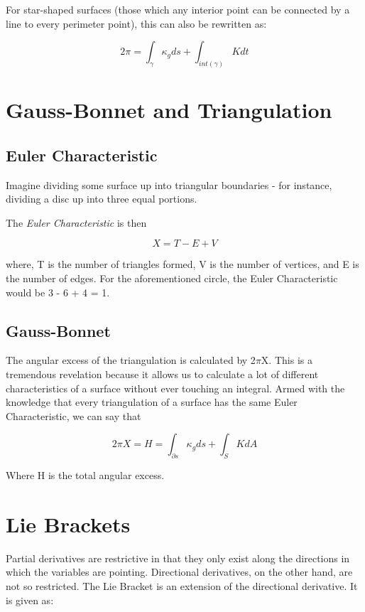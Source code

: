 \documentclass{article}
\begin{document}
For star-shaped surfaces (those which any interior point can be connected by a line to every perimeter point), this can also be rewritten as:

\[2\pi = \int_{\gamma} \kappa_{g} ds +  \int_{int(\gamma)} K dt\]

\section{Gauss-Bonnet and Triangulation}

\subsection{Euler Characteristic}

Imagine dividing some surface up into triangular boundaries - for instance, dividing a disc up into three equal portions.

The {\it{Euler Characteristic}} is then 

\[ X = T - E + V  \]

where, T is the number of triangles formed, V is the number of vertices, and E is the number of edges. For the aforementioned circle, the Euler Characteristic would be 3 - 6 + 4 = 1.

\subsection{Gauss-Bonnet}

The angular excess of the triangulation is calculated by 2$\pi$X. This is a tremendous revelation because it allows us to calculate a lot of different characteristics of a surface without ever touching an integral. Armed with the knowledge that every triangulation of a surface has the same Euler Characteristic, we can say that

\[ 2\pi X = H = \int_{\partial s} \kappa_{g} ds + \int_{S} K dA \]

Where H is the total angular excess.

\section{Lie Brackets}

Partial derivatives are restrictive in that they only exist along the directions in which the variables are pointing. Directional derivatives, on the other hand, are not so restricted. The Lie Bracket is an extension of the directional derivative. It is given as:
\end{document}
